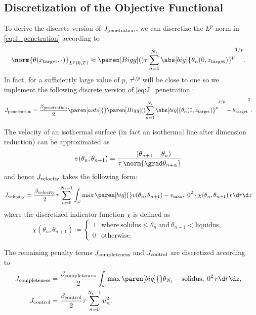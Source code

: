 \subsection{Discretization of the Objective Functional}
\label{subsec:disc_objective}

To derive the discrete version of $J_\textup{penetration}$, we can discretize the $L^p$-norm in \eqref{eq:J_penetration} according to
\begin{equation*}
	\norm{\theta(x_{\text{target}},\cdot)}_{L^p(0,T)}
	\approx
	\paren[Bigg](){\tau \sum_{n=1}^{N_t} \abs[big]{\theta_n(0,z_\textup{target})}^p}^{1/p}
	.
\end{equation*}
In fact, for a sufficiently large value of $p$, $\tau^{1/p}$ will be close to one so we implement the following discrete version of \eqref{eq:J_penetration}:
\begin{equation} \label{eq:J_penetration_discrete}
	J_\textup{penetration} 
	= 
	\frac{\beta_\textup{penetration}}{2}
	\paren[auto]\{\}{\paren[Bigg](){\sum_{n=1}^{N_t} \abs[big]{\theta_n(0,z_\textup{target})}^p}^{1/p} - \theta_\textup{target}}^2
	.
\end{equation}

The velocity of an isothermal surface (in fact an isothermal line after dimension reduction) can be approximated as
\begin{equation}
	v(\theta_n, \theta_{n+1}) 
	= 
	\frac{{}-{}(\theta_{n+1}-\theta_n)}{\tau \, \norm{\grad \theta_{n+\alpha}}}
\end{equation}
and hence $J_\textup{velocity}$ takes the following form:
\begin{equation}
	J_\textup{velocity} 
	=
	\frac{\beta_\textup{velocity}}{2} \tau \sum_{n=0}^{N_t-1} \int_{\omega} \max \paren[big]\{\}{v(\theta_n, \theta_{n+1}) - v_{\max}, \; 0}^2 \cdot
	\chi(\theta_n, \theta_{n+1})
	\, r \d r \d z
\end{equation}
where the discretized indicator function $\chi$ is defined as
\begin{equation}
	\chi(\theta_n, \theta_{n+1})
	\coloneqq
	\begin{cases}
		1 & \text{where}\ \text{solidus} \le \theta_n\ \text{and}\ \theta_{n+1} < \text{liquidus}
		,
		\\
		0 & \text{otherwise}
		.
	\end{cases}
\end{equation}

The remaining penalty terms $J_\textup{completeness}$ and $J_\textup{control}$ are discretized according to
\begin{align}
	J_\textup{completeness} 
	&
	=
	\frac{\beta_\textup{completeness}}{2} \int_{\omega} \max \paren[big]\{\}{\theta_{N_t} - \text{solidus}, \; 0}^2 \, r \d r \d z
	, 
	\\
	J_\textup{control} 
	&
	=
	\frac{\beta_\textup{control}}{2} \tau \sum_{n=0}^{N_t-1} u_n^2
	.
\end{align}



